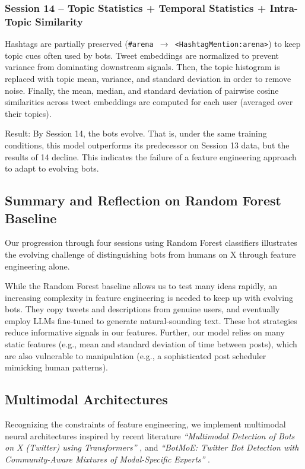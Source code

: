 \documentclass[conference]{IEEEtran}
\begin{document}
\subsubsection{\textbf{Session 14} – Topic Statistics + Temporal Statistics + Intra-Topic Similarity}
Hashtags are partially preserved (\texttt{\#arena $\rightarrow$ <HashtagMention:arena>}) to keep topic cues often used by bots.
Tweet embeddings are normalized to prevent variance from dominating downstream signals. Then, the topic histogram is replaced with topic mean, variance, and standard deviation in order to remove noise. Finally, the mean, median, and standard deviation of pairwise cosine similarities across tweet embeddings are computed for each user (averaged over their topics).

Result:
By Session 14, the bots evolve. That is, under
the same training conditions, 
this model outperforms its predecessor on Session 13 data, 
but the results of 14 decline.
This indicates the failure of a feature engineering approach to adapt to evolving bots.

\subsection{Summary and Reflection on Random Forest Baseline}
Our progression through four sessions using Random Forest classifiers
illustrates the evolving challenge of distinguishing bots from humans on 
X through feature engineering alone.


While the Random Forest baseline allows us to test many ideas rapidly, 
an increasing complexity in feature engineering is needed to keep up
with evolving bots. They copy tweets and descriptions
from genuine users, and eventually employ LLMs fine-tuned to generate natural-sounding text.
These bot strategies reduce informative signals in our features.
Further, our model relies on many static features (e.g., mean and standard deviation of time between posts),
which are also vulnerable to manipulation (e.g., a sophisticated post scheduler mimicking human patterns).


\subsection{\textbf{Multimodal Architectures}}
Recognizing the constraints of feature engineering, we
implement multimodal neural architectures inspired by recent
literature \textit{``Multimodal Detection of Bots on X (Twitter) using
Transformers''} \citep{ilias2023multimodal}, and \textit{``BotMoE: Twitter Bot Detection with Community-Aware
Mixtures of Modal-Specific Experts''} \citep{liu2023botmoe}.
\end{document}
